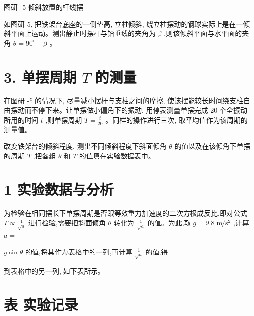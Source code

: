 \documentclass[10pt]{article}
\begin{document}
图研 -5 倾斜放置的杆线摆

如图研-5, 把铁架台底座的一侧垫高, 立柱倾斜, 绕立柱摆动的钢球实际上是在一倾斜平面上运动。测出静止时摆杆与铅垂线的夹角为 \(\beta\) ,则该倾斜平面与水平面的夹角 \(\theta = {90}^{ \circ } - \beta\) 。

\section*{3. 单摆周期 \(T\) 的测量}

在图研 -5 的情况下, 尽量减小摆杆与支柱之间的摩擦, 使该摆能较长时间绕支柱自由摆动而不停下来。让单摆做小偏角下的振动, 用停表测量单摆完成 20 个全振动所用的时间 \(t\) ,则单摆周期 \(T = \frac{t}{20}\) 。同样的操作进行三次, 取平均值作为该周期的测量值。

改变铁架台的倾斜程度, 测出不同倾斜程度下斜面倾角 \(\theta\) 的值以及在该倾角下单摆的周期 \(T\) ,把各组 \(\theta\) 和 \(T\) 的值填在实验数据表中。

\section*{1 实验数据与分析}

为检验在相同摆长下单摆周期是否跟等效重力加速度的二次方根成反比,即对公式 \(T \propto \frac{1}{\sqrt{a}}\) 进行检验,需要把斜面倾角 \(\theta\) 转化为 \(\frac{1}{\sqrt{a}}\) 的值。为此,取 \(g = {9.8}\mathrm{\;m}/{\mathrm{s}}^{2}\) ,计算 \(a =\)

\(g\sin \theta\) 的值,将其作为表格中的一列,再计算 \(\frac{1}{\sqrt{a}}\) 的值,得

到表格中的另一列, 如下表所示。

\section*{表 实验记录}

\begin{center}
\end{center}
\end{document}

